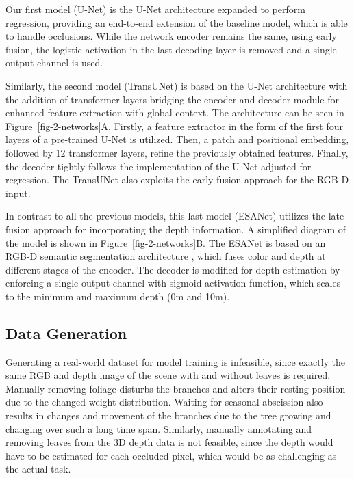Our first model (U-Net) is the U-Net architecture expanded to perform regression, providing an end-to-end extension of the baseline model, which is able to handle occlusions.
While the network encoder remains the same, using early fusion, the logistic activation in the last decoding layer is removed and a single output channel is used.

Similarly, the second model (TransUNet) \cite{Chen2021c} is based on the U-Net architecture with the addition of transformer layers bridging the encoder and decoder module for enhanced feature extraction with global context. The architecture can be seen in Figure~\ref{fig-2-networks}A. Firstly, a feature extractor in the form of the first four layers of a pre-trained U-Net is utilized. Then, a patch and positional embedding, followed by 12 transformer layers, refine the previously obtained features. Finally, the decoder tightly follows the implementation of the U-Net adjusted for regression. The TransUNet also exploits the early fusion approach for the RGB-D input.

In contrast to all the previous models, this last model (ESANet) utilizes the late fusion approach for incorporating the depth information. A simplified diagram of the model is shown in Figure~\ref{fig-2-networks}B.
The ESANet is based on an RGB-D semantic segmentation architecture \cite{Seichter2020ESANet}, which fuses color and depth at different stages of the encoder. The decoder is modified for depth estimation by enforcing a single output channel with sigmoid activation function, which scales to the minimum and maximum depth (0m and 10m).

\subsection{Data Generation}
Generating a real-world dataset for model training is infeasible, since exactly the same RGB and depth image of the scene with and without leaves is required. Manually removing foliage disturbs the branches and alters their resting position due to the changed weight distribution. Waiting for seasonal abscission also results in changes and movement of the branches due to the tree growing and changing over such a long time span. Similarly, manually annotating and removing leaves from the 3D depth data is not feasible, since the depth would have to be estimated for each occluded pixel, which would be as challenging as the actual task.

